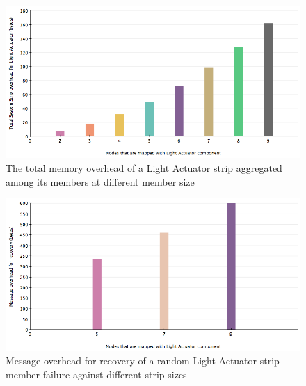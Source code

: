 
\begin{figure}[h!]
\centering
    \includegraphics[width=\linewidth]{figures/results-system-overhead-vs-network-size}
\caption{The total memory overhead of a Light Actuator strip aggregated among its members at different member size}
\label{fig:results-system-overhead-vs-network-size}
\end{figure}


\begin{figure}[h!]
\centering
    \includegraphics[width=\linewidth]{figures/results-message-overhead-vs-strip-size}
\caption{Message overhead for recovery of a random Light Actuator strip member failure against different strip sizes}
\label{fig:results-message-overhead-vs-strip-size}
\end{figure}

